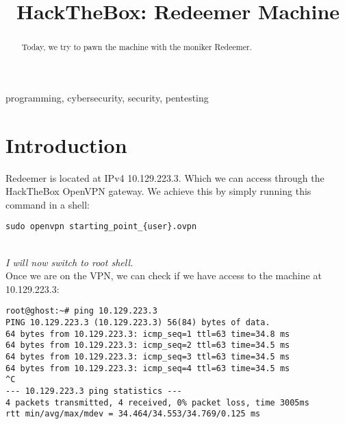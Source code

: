 \documentclass[conference]{IEEEtran}
\begin{document}
\title{HackTheBox: Redeemer Machine}

\author{
}

\maketitle



\begin{abstract}
Today, we try to pawn the machine with the moniker Redeemer.
\end{abstract}



\begin{IEEEkeywords}
programming, cybersecurity, security, pentesting
\end{IEEEkeywords}


\section{Introduction}
Redeemer is located at IPv4 10.129.223.3. Which we can access through the HackTheBox OpenVPN gateway.
We achieve this by simply running this command in a shell:
\begin{scriptsize}
\begin{verbatim}
sudo openvpn starting_point_{user}.ovpn
\end{verbatim}
\end{scriptsize}

\\
\textit{I will now switch to root shell.}
\\

Once we are on the VPN, we can check if we have access to the machine at 10.129.223.3:
\begin{scriptsize}
\begin{verbatim}
root@ghost:~# ping 10.129.223.3
PING 10.129.223.3 (10.129.223.3) 56(84) bytes of data.
64 bytes from 10.129.223.3: icmp_seq=1 ttl=63 time=34.8 ms
64 bytes from 10.129.223.3: icmp_seq=2 ttl=63 time=34.5 ms
64 bytes from 10.129.223.3: icmp_seq=3 ttl=63 time=34.5 ms
64 bytes from 10.129.223.3: icmp_seq=4 ttl=63 time=34.5 ms
^C
--- 10.129.223.3 ping statistics ---
4 packets transmitted, 4 received, 0% packet loss, time 3005ms
rtt min/avg/max/mdev = 34.464/34.553/34.769/0.125 ms

\end{verbatim}
\end{scriptsize}
\end{document}
